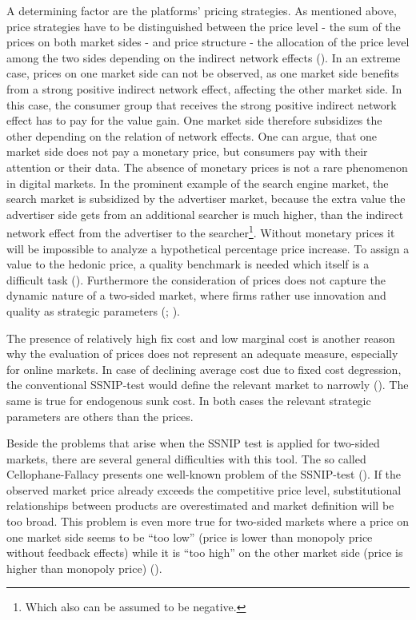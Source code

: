 \documentclass[12pt,a4paper,notitlepage]{article}
\begin{document}
A determining factor are the platforms' pricing strategies. As mentioned above, price strategies have to be distinguished between the price level - the sum of the prices on both market sides - and price structure - the allocation of the price level among the two sides depending on the indirect network effects (\cite{rochet_two-sided_2006}). In an extreme case, prices on one market side can not be observed, as one market side benefits from a strong positive indirect network effect, affecting the other market side. In this case, the consumer group that receives the strong positive indirect network effect has to pay for the value gain. One market side therefore subsidizes the other depending on the relation of network effects. One can argue, that one market side does not pay a monetary price, but consumers pay with their attention or their data. The absence of monetary prices is not a rare phenomenon in digital markets. In the prominent example of the search engine market, the search market is subsidized by the advertiser market, because the extra value the advertiser side gets from an additional searcher is much higher, than the indirect network effect from the advertiser to the searcher\footnote{Which also can be assumed to be negative.}. Without monetary prices it will be impossible to analyze a hypothetical percentage price increase. To assign a value to the hedonic price, a quality benchmark is needed which itself is a difficult task (\cite{filistrucchi_market_2013}). Furthermore the consideration of prices does not capture the dynamic nature of a two-sided market, where firms rather use innovation and quality as strategic parameters (\cite{evans_economic_2002}; \cite{gual_market_2003}). 

The presence of relatively high fix cost and low marginal cost is another reason why the evaluation of prices does not represent an adequate measure, especially for online markets. In case of declining average cost due to fixed cost degression, the conventional SSNIP-test would define the relevant market to narrowly (\cite{gual_market_2003}). The same is true for endogenous sunk cost. In both cases  the relevant strategic parameters are others than the prices.

Beside the problems that arise when the SSNIP test is applied for two-sided markets, there are several general difficulties with this tool. The so called Cellophane-Fallacy  presents one well-known problem of the SSNIP-test (\cite{schaerr_cellophane_1985}). If the observed market price already exceeds the competitive price level, substitutional relationships between products are overestimated and market definition will be too broad. This problem is even more true for two-sided markets where a price on one market side seems to be “too low” (price is lower than monopoly price without feedback effects) while it is “too high” on the other market side (price is higher than monopoly price) (\cite{dewenter_einfuehrung_2014}).
\end{document}
